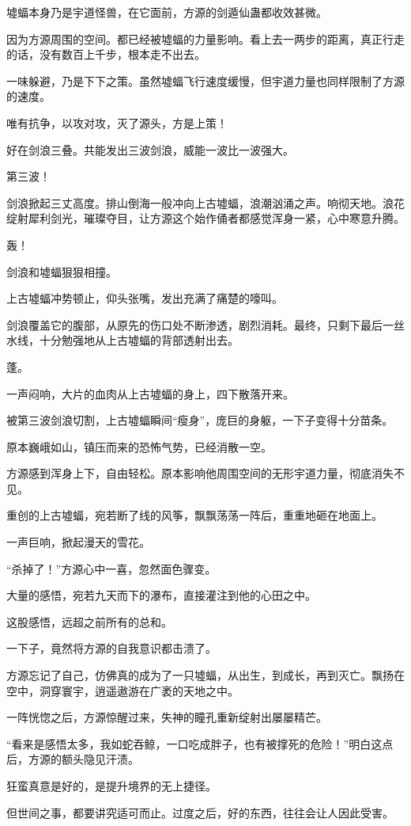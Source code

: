 \begin{this_body}
墟蝠本身乃是宇道怪兽，在它面前，方源的剑遁仙蛊都收效甚微。

因为方源周围的空间。都已经被墟蝠的力量影响。看上去一两步的距离，真正行走的话，没有数百上千步，根本走不出去。

一味躲避，乃是下下之策。虽然墟蝠飞行速度缓慢，但宇道力量也同样限制了方源的速度。

唯有抗争，以攻对攻，灭了源头，方是上策！

好在剑浪三叠。共能发出三波剑浪，威能一波比一波强大。

第三波！

剑浪掀起三丈高度。排山倒海一般冲向上古墟蝠，浪潮汹涌之声。响彻天地。浪花绽射犀利剑光，璀璨夺目，让方源这个始作俑者都感觉浑身一紧，心中寒意升腾。

轰！

剑浪和墟蝠狠狠相撞。

上古墟蝠冲势顿止，仰头张嘴，发出充满了痛楚的嚎叫。

剑浪覆盖它的腹部，从原先的伤口处不断渗透，剧烈消耗。最终，只剩下最后一丝水线，十分勉强地从上古墟蝠的背部透射出去。

蓬。

一声闷响，大片的血肉从上古墟蝠的身上，四下散落开来。

被第三波剑浪切割，上古墟蝠瞬间“瘦身”，庞巨的身躯，一下子变得十分苗条。

原本巍峨如山，镇压而来的恐怖气势，已经消散一空。

方源感到浑身上下，自由轻松。原本影响他周围空间的无形宇道力量，彻底消失不见。

重创的上古墟蝠，宛若断了线的风筝，飘飘荡荡一阵后，重重地砸在地面上。

一声巨响，掀起漫天的雪花。

“杀掉了！”方源心中一喜，忽然面色骤变。

大量的感悟，宛若九天而下的瀑布，直接灌注到他的心田之中。

这股感悟，远超之前所有的总和。

一下子，竟然将方源的自我意识都击溃了。

方源忘记了自己，仿佛真的成为了一只墟蝠，从出生，到成长，再到灭亡。飘扬在空中，洞穿寰宇，逍遥遨游在广袤的天地之中。

一阵恍惚之后，方源惊醒过来，失神的瞳孔重新绽射出屡屡精芒。

“看来是感悟太多，我如蛇吞鲸，一口吃成胖子，也有被撑死的危险！”明白这点后，方源的额头隐见汗渍。

狂蛮真意是好的，是提升境界的无上捷径。

但世间之事，都要讲究适可而止。过度之后，好的东西，往往会让人因此受害。


\end{this_body}
